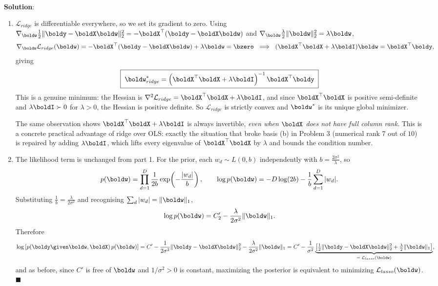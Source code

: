 \documentclass[submit]{../harvardml}
\newenvironment{solution}{
    \vspace{2mm}
    \color{blue}\noindent\textbf{Solution}:
}{}
\begin{document}
\begin{solution}
\begin{enumerate}
\item
$\mathcal L_{ridge}$ is differentiable everywhere, so we set its gradient to
zero. Using $\nabla_{\boldw}\tfrac12\|\boldy - \boldX\boldw\|_2^2
= -\boldX^\top(\boldy - \boldX\boldw)$ and
$\nabla_{\boldw}\tfrac{\lambda}{2}\|\boldw\|_2^2 = \lambda\boldw$,
\[
  \nabla_{\boldw}\mathcal L_{ridge}(\boldw)
  = -\boldX^\top(\boldy - \boldX\boldw) + \lambda\boldw = \bzero
  \;\;\Longrightarrow\;\;
  (\boldX^\top\boldX + \lambda\boldI)\boldw = \boldX^\top\boldy ,
\]
giving
\[
  \boxed{\;\boldw^*_{ridge} = \left(\boldX^\top\boldX + \lambda\boldI\right)^{-1}\boldX^\top\boldy\;}
\]
This is a genuine minimum: the Hessian is
$\nabla^2\mathcal L_{ridge} = \boldX^\top\boldX + \lambda\boldI$, and since
$\boldX^\top\boldX$ is positive semi-definite and $\lambda\boldI \succ 0$ for
$\lambda > 0$, the Hessian is positive definite. So $\mathcal L_{ridge}$ is
strictly convex and $\boldw^*$ is its unique global minimizer.

\noindent The same observation shows $\boldX^\top\boldX + \lambda\boldI$ is
always invertible, \emph{even when $\boldX$ does not have full column rank}.
This is a concrete practical advantage of ridge over OLS: exactly the situation
that broke basis (b) in Problem 3 (numerical rank $7$ out of $10$) is repaired
by adding $\lambda\boldI$, which lifts every eigenvalue of $\boldX^\top\boldX$
by $\lambda$ and bounds the condition number.

\item
The likelihood term is unchanged from part 1. For the prior, each $w_d \sim
L\!\left(0, b\right)$ independently with $b = \frac{2\sigma^2}{\lambda}$, so
\[
  p(\boldw) = \prod_{d=1}^{D}\frac{1}{2b}\exp\!\left(-\frac{|w_d|}{b}\right),
  \qquad
  \log p(\boldw) = -D\log(2b) - \frac{1}{b}\sum_{d=1}^{D}|w_d| .
\]
Substituting $\frac1b = \frac{\lambda}{2\sigma^2}$ and recognising
$\sum_d |w_d| = \|\boldw\|_1$,
\[
  \log p(\boldw) = C_2' - \frac{\lambda}{2\sigma^2}\|\boldw\|_1 .
\]
Therefore
\[
  \log\left[p(\boldy\given\boldw,\boldX)\,p(\boldw)\right]
  = C' - \frac{1}{2\sigma^2}\|\boldy - \boldX\boldw\|_2^2
      - \frac{\lambda}{2\sigma^2}\|\boldw\|_1
  = C' - \frac{1}{\sigma^2}\underbrace{\left[\tfrac12\|\boldy-\boldX\boldw\|_2^2
      + \tfrac\lambda2\|\boldw\|_1\right]}_{=\;\mathcal{L}_{lasso}(\boldw)} ,
\]
and as before, since $C'$ is free of $\boldw$ and $1/\sigma^2 > 0$ is constant,
maximizing the posterior is equivalent to minimizing
$\mathcal{L}_{lasso}(\boldw)$. $\blacksquare$


\end{enumerate}
\end{solution}
\end{document}
